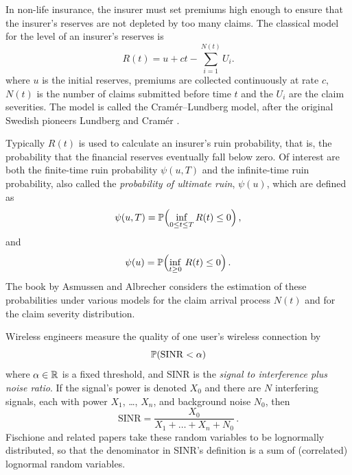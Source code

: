 \begin{example}

In non-life insurance, the insurer must set premiums high enough to ensure that the insurer's reserves are not depleted by too many claims. The classical model for the level of an insurer's reserves is
\begin{equation*}
R(t)=u+ct-\sum_{i=1}^{N(t)}U_i.
\end{equation*}
where $u$ is the initial reserves, premiums are collected continuously at rate $c$, $N(t)$ is the number of claims submitted before time $t$ and the $U_i$ are the claim severities. The model is called the Cram{\'e}r--Lundberg model, after the original Swedish pioneers Lundberg \cite{lundberg1903approximerad} and Cram{\'e}r \cite{cramer1930mathematical}.

Typically $R(t)$ is used to calculate an insurer's ruin probability, that is, the probability that the financial reserves eventually fall below zero. Of interest are both the finite-time ruin probability $\psi(u,T)$ and the infinite-time ruin probability, also called the \emph{probability of ultimate ruin}, $\psi(u)$, which are defined as
\begin{equation*}
\psi(u,T)=\operatorname{{\mathbb P}}\Bigl( \inf_{0 \le t \le T} R(t) \leq 0 \Bigr)\,,
\end{equation*}
and
\begin{equation*}
\psi(u)=\operatorname{{\mathbb P}}\Bigl( \inf_{t \geq 0}\,R(t) \leq 0 \Bigr)\,.
\end{equation*}
The book by Asmussen and Albrecher \cite{asmussen2010ruin} considers the estimation of these probabilities under various models for the claim arrival process $N(t)$ and for the claim severity distribution.
\remQED
\end{example}

\begin{example}
Wireless engineers measure the quality of one user's wireless connection by
\[ \operatorname{{\mathbb P}}( \mathrm{SINR} < \alpha ) \]
where $\alpha \in \mathbb{R}$ is a fixed threshold, and SINR is the \emph{signal to interference plus noise ratio}. If the signal's power is denoted $X_0$ and there are $N$ interfering signals, each with power $X_1$, \dots, $X_n$, and background noise $N_0$, then
\[ \mathrm{SINR} = \frac{X_0}{X_1 + \dots + X_n + N_0} \,. \]
Fischione \cite{fischione2007approximation} and related papers take these random variables to be lognormally distributed, so that the denominator in SINR's definition is a sum of (correlated) lognormal random variables.
\remQED
\end{example}

